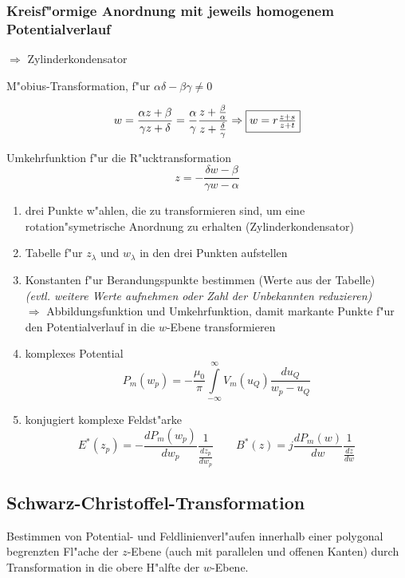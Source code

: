 \clearpage

\subsubsection{Kreisf"ormige Anordnung mit jeweils homogenem Potentialverlauf}
      $\Rightarrow$ Zylinderkondensator

M"obius-Transformation, f"ur $\alpha \delta - \beta \gamma \not= 0$

$$w=\frac{\alpha z+\beta}{\gamma z+\delta} =\frac{\alpha}{\gamma}
\frac{z+\frac{\beta}{\alpha}}{z+\frac{\delta}{\gamma}}\Rightarrow
\fbox{$w=r\frac{z+s}{z+t}$}$$

Umkehrfunktion f"ur die R"ucktransformation
$$z=-\frac{\delta w-\beta}{\gamma w-\alpha}$$

\begin{enumerate}
\item drei Punkte w"ahlen, die zu transformieren sind, um
      eine rotation"symetrische Anordnung zu erhalten (Zylinderkondensator)
\item Tabelle f"ur $z_\lambda$ und $w_\lambda$ in den drei Punkten aufstellen
\item Konstanten f"ur Berandungspunkte bestimmen (Werte aus der Tabelle)\\
      {\sl (evtl. weitere Werte aufnehmen oder Zahl der Unbekannten
      reduzieren)}\\
      $\Rightarrow$ Abbildungsfunktion und Umkehrfunktion, damit
      markante Punkte f"ur den Potentialverlauf in die $w$-Ebene
      transformieren
\item komplexes Potential
     $$P_m(w_p)=-\frac{\mu_0}{\pi}\int\limits_{-\infty}^\infty V_m(u_Q)
     \frac{du_Q}{w_p-u_Q}$$
\item konjugiert komplexe Feldst"arke
      $$E^\ast(z_p)=-\frac{dP_m(w_p)}{dw_p}\frac{1}{\frac{dz_p}{dw_p}} \qquad
      B^\ast(z)=j\frac{dP_m(w)}{dw} \frac{1}{\frac{dz}{dw}}$$
\end{enumerate}

\clearpage
\subsection{Schwarz-Christoffel-Transformation}
Bestimmen von Potential- und Feldlinienverl"aufen innerhalb einer polygonal
begrenzten Fl"ache der $z$-Ebene (auch mit parallelen und offenen Kanten) durch
Transformation in die obere H"alfte der $w$-Ebene.

